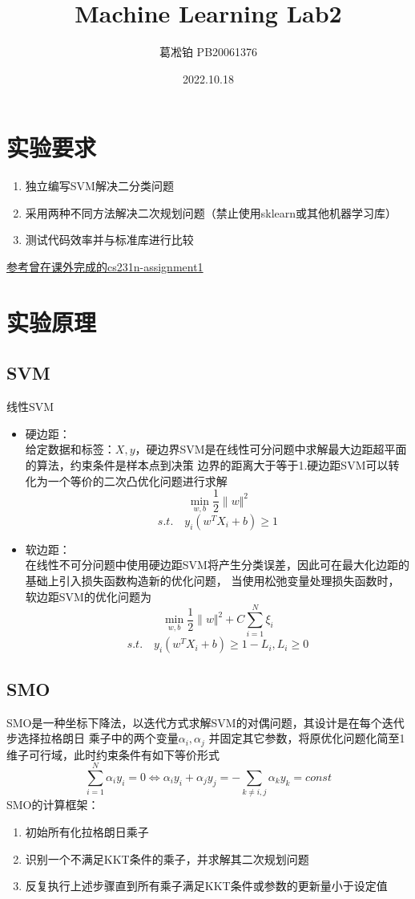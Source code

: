 \documentclass[12pt, a4paper, oneside]{ctexart}
\title{Machine Learning Lab2}
\author{葛凇铂 PB20061376}
\date{2022.10.18}
\begin{document}
\maketitle
\section*{实验要求}
\begin{enumerate}
    \item 独立编写SVM解决二分类问题
    \item 采用两种不同方法解决二次规划问题（禁止使用sklearn或其他机器学习库）
    \item 测试代码效率并与标准库进行比较
\end{enumerate}
\href{https://github.com/gsb-ustc/CS231n-2020-assignment-solution}{参考曾在课外完成的cs231n-assignment1}

\section*{实验原理}
\subsection*{SVM}
线性SVM
\begin{itemize}
    \item 硬边距：\\
    给定数据和标签：$X,y$，硬边界SVM是在线性可分问题中求解最大边距超平面的算法，约束条件是样本点到决策
    边界的距离大于等于1.硬边距SVM可以转化为一个等价的二次凸优化问题进行求解
    $$\min_{w,b} \frac{1}{2}\| w\Vert^{2} $$
    $$s.t. \quad y_{i}(w^{T}X_{i}+b) \geq 1$$
    \item 软边距：\\
    在线性不可分问题中使用硬边距SVM将产生分类误差，因此可在最大化边距的基础上引入损失函数构造新的优化问题，
    当使用松弛变量处理损失函数时，软边距SVM的优化问题为
    $$\min_{w,b} \frac{1}{2}\| w\Vert^{2}+C\sum_{i=1}^{N}\xi _{i}$$
    $$s.t. \quad y_{i}(w^{T}X_{i}+b) \geq 1 - L_{i},L_{i}\geq 0 $$
\end{itemize}
\subsection*{SMO}
SMO是一种坐标下降法，以迭代方式求解SVM的对偶问题，其设计是在每个迭代步选择拉格朗日
乘子中的两个变量$\alpha_{i},\alpha_{j}$ 并固定其它参数，将原优化问题化简至1维子可行域，此时约束条件有如下等价形式
$$\sum_{i=1}^{N}\alpha_{i}y_{i}=0 \Longleftrightarrow \alpha_{i}y_{i}+\alpha_{j}y_{j}=-\sum_{k\neq i,j}\alpha_{k}y_{k}=const$$
SMO的计算框架：
\begin{enumerate}
    \item 初始所有化拉格朗日乘子
    \item 识别一个不满足KKT条件的乘子，并求解其二次规划问题
    \item 反复执行上述步骤直到所有乘子满足KKT条件或参数的更新量小于设定值
\end{enumerate}
\end{document}
